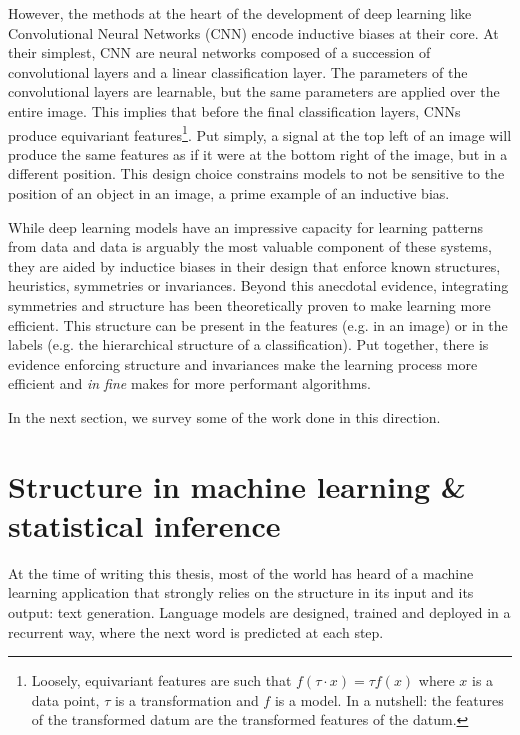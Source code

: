 However, the methods at the heart of the development of deep learning like Convolutional Neural Networks (CNN) encode inductive biases at their core. At their simplest, CNN are neural networks composed of a succession of convolutional layers and a linear classification layer. The parameters of the convolutional layers are learnable, but the same parameters are applied over the entire image. This implies that before the final classification layers, CNNs produce equivariant features\footnote{Loosely, equivariant features are such that $f(\tau \cdot x)=\tau f(x)$ where $x$ is a data point, $\tau$ is a transformation and $f$ is a model. In a nutshell: the features of the transformed datum are the transformed features of the datum.}. Put simply, a signal at the top left of an image will produce the same features as if it were at the bottom right of the image, but in a different position. This design choice constrains models to not be sensitive to the position of an object in an image, a prime example of an inductive bias.


While deep learning models have an impressive capacity for learning patterns from data and data is arguably the most valuable component of these systems, they are aided by inductice biases in their design that enforce known structures, heuristics, symmetries or invariances. Beyond this anecdotal evidence, integrating symmetries and structure has been theoretically proven to make learning more efficient. This structure can be present in the features (e.g. in an image) or in the labels (e.g. the hierarchical structure of a classification). Put together, there is evidence enforcing structure and invariances make the learning process more efficient and \emph{in fine} makes for more performant algorithms.

In the next section, we survey some of the work done in this direction.

\section{Structure in machine learning \& statistical inference}
At the time of writing this thesis, most of the world has heard of a machine learning application that strongly relies on the structure in its input and its output: text generation. Language models are designed, trained and deployed in a recurrent way, where the next word is predicted at each step.

